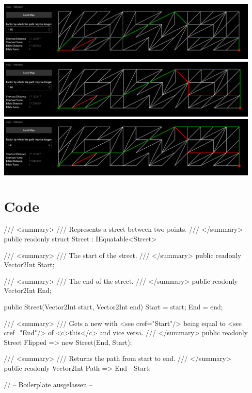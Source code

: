 \documentclass{article}
\theoremstyle{nonumberplain}
\begin{document}
\begin{center}
\includegraphics[width=\textwidth]{examples/3_02.png}
\includegraphics[width=\textwidth]{examples/3_04.png}
\includegraphics[width=\textwidth]{examples/3_30.png}
\end{center}

\section{Code}

\begin{lstcs}[]
/// <summary>
/// Represents a street between two points.
/// </summary>
public readonly struct Street : IEquatable<Street>
{
    /// <summary>
    /// The start of the street.
    /// </summary>
    public readonly Vector2Int Start;

    /// <summary>
    /// The end of the street.
    /// </summary>
    public readonly Vector2Int End;

    public Street(Vector2Int start, Vector2Int end)
    {
        Start = start;
        End = end;
    }

    /// <summary>
    /// Gets a new with <see cref="Start"/> being equal to <see cref="End"/> of <c>this</c> and vice versa.
    /// </summary>
    public readonly Street Flipped => new Street(End, Start);

    /// <summary>
    /// Returns the path from start to end.
    /// </summary>
    public readonly Vector2Int Path => End - Start;

    // -- Boilerplate ausgelassen --
}
\end{lstcs}
\end{document}
